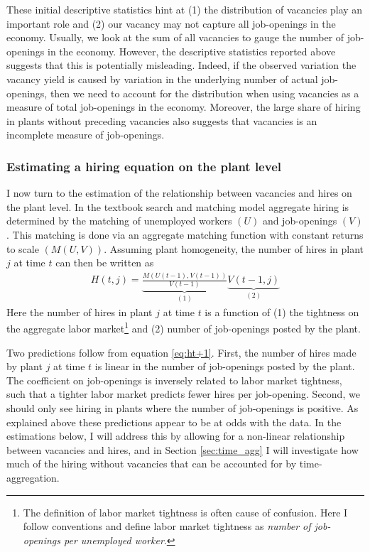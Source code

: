 These initial descriptive statistics hint at (1) the distribution of vacancies play an important role and (2) our vacancy may not capture all job-openings in the economy. Usually, we look at the sum of all vacancies to gauge the number of job-openings in the economy. However, the descriptive statistics reported above suggests that this is potentially misleading. Indeed, if the observed variation the vacancy yield is caused by variation in the underlying number of actual job-openings, then we need to account for the distribution when using vacancies as a measure of total job-openings in the economy. Moreover, the large share of hiring in plants without preceding vacancies also suggests that vacancies is an incomplete measure of job-openings.

\subsubsection{Estimating a hiring equation on the plant level}

I now turn to the estimation of the relationship between vacancies and hires on the plant level. In the textbook search and matching model aggregate hiring is determined by the matching of unemployed workers $(U)$ and job-openings $(V)$. This matching is done via an aggregate matching function with constant returns to scale $(M(U,V))$. Assuming plant homogeneity, the number of hires in plant $j$ at time $t$ can then be written as 
\begin{align}
H(t, j)=\underbrace{\frac{M(U(t-1),V(t-1))}{V(t-1)}}_{(1)} \underbrace{V(t-1,j)}_{(2)}
\label{eq:ht+1}
\end{align}
Here the number of hires in plant $j$ at time $t$ is a function of (1) the tightness on the aggregate labor market\footnote{The definition of labor market tightness is often cause of confusion. Here I follow conventions and define labor market tightness as \emph{number of job-openings per unemployed worker}.} and (2) number of job-openings posted by the plant.

Two predictions follow from equation \eqref{eq:ht+1}. First, the number of hires made by plant $j$ at time $t$ is linear in the number of job-openings posted by the plant. The coefficient on job-openings is inversely related to labor market tightness, such that a tighter labor market predicts fewer hires per job-opening. Second, we should only see hiring in plants where the number of job-openings is positive. As explained above these predictions appear to be at odds with the data. In the estimations below, I will address this by allowing for a non-linear relationship between vacancies and hires, and in Section \ref{sec:time_agg} I will investigate how much of the hiring without vacancies that can be accounted for by time-aggregation. 

